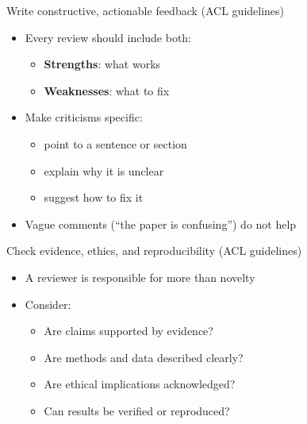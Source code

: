\documentclass[aspectratio=169]{beamer}
\begin{document}

\begin{frame}{Write constructive, actionable feedback (ACL guidelines)}
\begin{itemize}
  \item Every review should include both:
    \begin{itemize}
      \item \textbf{Strengths}: what works
      \item \textbf{Weaknesses}: what to fix
    \end{itemize}
  \item Make criticisms specific:
    \begin{itemize}
      \item point to a sentence or section
      \item explain why it is unclear
      \item suggest how to fix it
    \end{itemize}
  \item Vague comments (``the paper is confusing'') do not help
\end{itemize}

\end{frame}


\begin{frame}{Check evidence, ethics, and reproducibility (ACL guidelines)}
\begin{itemize}
  \item A reviewer is responsible for more than novelty
  \item Consider:
    \begin{itemize}
      \item Are claims supported by evidence?
      \item Are methods and data described clearly?
      \item Are ethical implications acknowledged?
      \item Can results be verified or reproduced?
    \end{itemize}
\end{itemize}

\end{frame}

\end{document}
